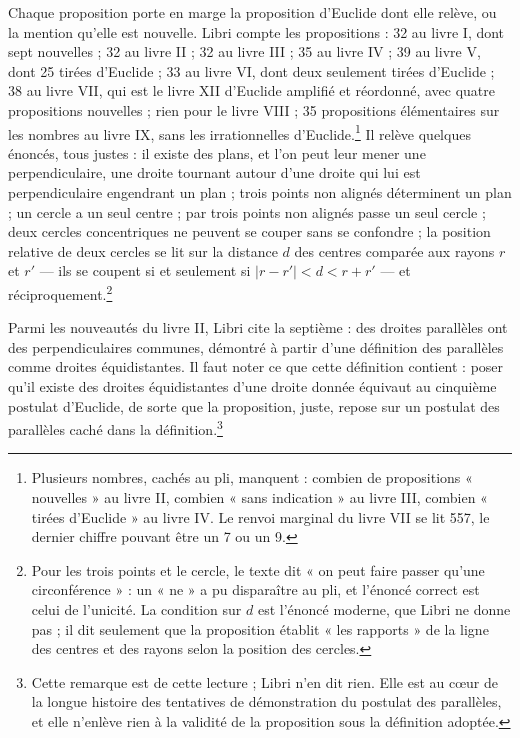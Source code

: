 \documentclass[11pt,a4paper]{article}
\begin{document}
Chaque proposition porte en marge la proposition d'Euclide dont elle relève,
ou la mention qu'elle est nouvelle. Libri compte les propositions : 32 au
livre I, dont sept nouvelles ; 32 au livre II ; 32 au livre III ; 35 au
livre IV ; 39 au livre V, dont 25 tirées d'Euclide ; 33 au livre VI, dont
deux seulement tirées d'Euclide ; 38 au livre VII, qui est le livre XII
d'Euclide amplifié et réordonné, avec quatre propositions nouvelles ; rien
pour le livre VIII ; 35 propositions élémentaires sur les nombres au livre
IX, sans les irrationnelles d'Euclide.\footnote{Plusieurs nombres, cachés
au pli, manquent : combien de propositions « nouvelles » au livre II, combien
« sans indication » au livre III, combien « tirées d'Euclide » au livre IV.
Le renvoi marginal du livre VII se lit 557, le dernier chiffre pouvant être un
7 ou un 9.} Il relève quelques énoncés, tous justes : il existe des plans, et
l'on peut leur mener une perpendiculaire, une droite tournant autour d'une
droite qui lui est perpendiculaire engendrant un plan ; trois points non
alignés déterminent un plan ; un cercle a un seul centre ; par trois points
non alignés passe un seul cercle ; deux cercles concentriques ne peuvent se
couper sans se confondre ; la position relative de deux cercles se lit sur
la distance $d$ des centres comparée aux rayons $r$ et $r'$ — ils se coupent
si et seulement si $|r - r'| < d < r + r'$ — et réciproquement.\footnote{Pour
les trois points et le cercle, le texte dit « on peut faire passer qu'une
circonférence » : un « ne » a pu disparaître au pli, et l'énoncé correct est
celui de l'unicité. La condition sur $d$ est l'énoncé moderne, que Libri ne
donne pas ; il dit seulement que la proposition établit « les rapports » de la
ligne des centres et des rayons selon la position des cercles.}

Parmi les nouveautés du livre II, Libri cite la septième : des droites
parallèles ont des perpendiculaires communes, démontré à partir d'une
définition des parallèles comme droites équidistantes. Il faut noter ce que
cette définition contient : poser qu'il existe des droites équidistantes
d'une droite donnée équivaut au cinquième postulat d'Euclide, de sorte que la
proposition, juste, repose sur un postulat des parallèles caché dans la
définition.\footnote{Cette remarque est de cette lecture ; Libri n'en dit
rien. Elle est au cœur de la longue histoire des tentatives de démonstration
du postulat des parallèles, et elle n'enlève rien à la validité de la
proposition sous la définition adoptée.}
\end{document}
